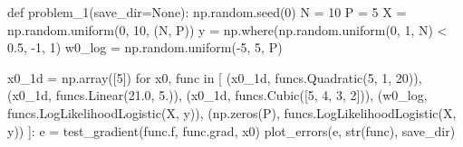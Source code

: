 \documentclass{homework}
\begin{document}
\begin{center}
\begin{python}
        
        

def problem_1(save_dir=None):
    np.random.seed(0)
    N = 10
    P = 5
    X = np.random.uniform(0, 10, (N, P))
    y = np.where(np.random.uniform(0, 1, N) < 0.5, -1, 1)
    w0_log = np.random.uniform(-5, 5, P)


    x0_1d = np.array([5])
    for x0, func in [
        (x0_1d, funcs.Quadratic(5, 1, 20)),
        (x0_1d, funcs.Linear(21.0, 5.)),
        (x0_1d, funcs.Cubic([5, 4, 3, 2])),
        (w0_log, funcs.LogLikelihoodLogistic(X, y)),
        (np.zeros(P), funcs.LogLikelihoodLogistic(X, y))
    ]:
        e = test_gradient(func.f, func.grad, x0)
        plot_errors(e, str(func), save_dir)
                        
\end{python}
    \label{fig:python1}
\end{center}
\end{document}
